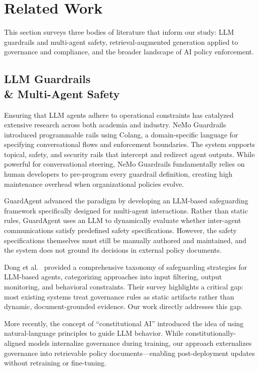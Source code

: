 \documentclass[sigconf,screen]{acmart}
\begin{document}
\section{Related Work}

This section surveys three bodies of literature that inform our study: LLM guardrails and multi-agent safety, retrieval-augmented generation applied to governance and compliance, and the broader landscape of AI policy enforcement.

\subsection{LLM Guardrails \\\& Multi-Agent Safety}
Ensuring that LLM agents adhere to operational constraints has catalyzed extensive research across both academia and industry. NeMo Guardrails \cite{rebedea2023nemo} introduced programmable rails using Colang, a domain-specific language for specifying conversational flows and enforcement boundaries. The system supports topical, safety, and security rails that intercept and redirect agent outputs. While powerful for conversational steering, NeMo Guardrails fundamentally relies on human developers to pre-program every guardrail definition, creating high maintenance overhead when organizational policies evolve.

GuardAgent \cite{chen2024guardagent} advanced the paradigm by developing an LLM-based safeguarding framework specifically designed for multi-agent interactions. Rather than static rules, GuardAgent uses an LLM to dynamically evaluate whether inter-agent communications satisfy predefined safety specifications. However, the safety specifications themselves must still be manually authored and maintained, and the system does not ground its decisions in external policy documents.

Dong et al.\ \cite{dong2024safeguarding} provided a comprehensive taxonomy of safeguarding strategies for LLM-based agents, categorizing approaches into input filtering, output monitoring, and behavioral constraints. Their survey highlights a critical gap: most existing systems treat governance rules as static artifacts rather than dynamic, document-grounded evidence. Our work directly addresses this gap.

More recently, the concept of ``constitutional AI'' \cite{bai2022constitutional} introduced the idea of using natural-language principles to guide LLM behavior. While constitutionally-aligned models internalize governance during training, our approach externalizes governance into retrievable policy documents---enabling post-deployment updates without retraining or fine-tuning.
\end{document}
